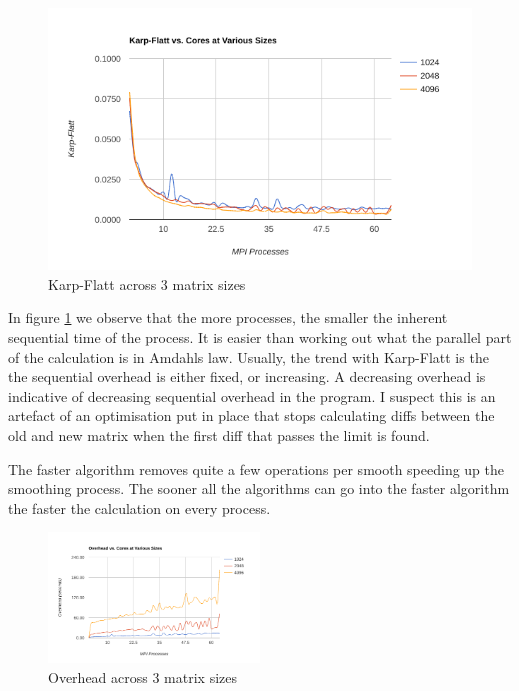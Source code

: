 \documentclass[a4paper,10pt]{report}
\begin{document}
\begin{figure}[!t]
 \centering
 \includegraphics[width=\textwidth]{./images/sizes-karpflatt.png}
 \caption{Karp-Flatt across 3 matrix sizes}
 \label{fig:sizeskarpflatt}
\end{figure}

In figure \ref{fig:sizeskarpflatt} we observe that the more processes, the smaller the inherent sequential time of the process. It is easier than working out what the parallel part of the calculation is in Amdahls law. Usually, the trend with Karp-Flatt is the the sequential overhead is either fixed, or increasing. A decreasing overhead is indicative of decreasing sequential overhead in the program. I suspect this is an artefact of an optimisation put in place that stops calculating diffs between the old and new matrix when the first diff that passes the limit is found.

The faster algorithm removes quite a few operations per smooth speeding up the smoothing process. The sooner all the algorithms can go into the faster algorithm the faster the calculation on every process.

\begin{figure}
 \centering
 \includegraphics[width=0.5\textwidth]{./images/sizes-overhead.png}
 \caption{Overhead across 3 matrix sizes}
 \label{fig:sizesoverhead}
\end{figure}
\end{document}
